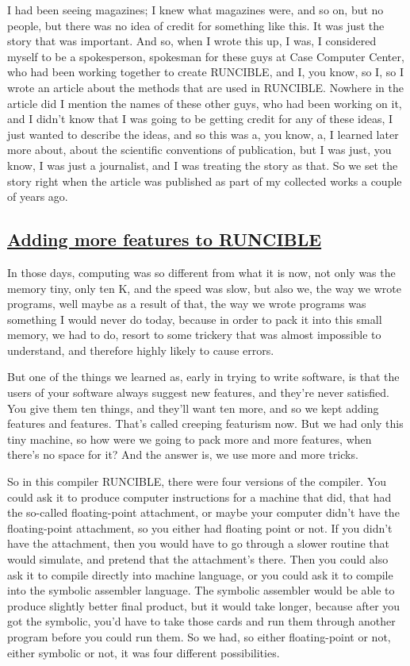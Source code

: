 \documentclass[]{article}
\begin{document}
I had been seeing magazines; I knew what magazines were, and so on, but
no people, but there was no idea of credit for something like this. It
was just the story that was important. And so, when I wrote this up, I
was, I considered myself to be a spokesperson, spokesman for these guys
at Case Computer Center, who had been working together to create
RUNCIBLE, and I, you know, so I, so I wrote an article about the methods
that are used in RUNCIBLE. Nowhere in the article did I mention the
names of these other guys, who had been working on it, and I didn't know
that I was going to be getting credit for any of these ideas, I just
wanted to describe the ideas, and so this was a, you know, a, I learned
later more about, about the scientific conventions of publication, but I
was just, you know, I was just a journalist, and I was treating the
story as that. So we set the story right when the article was published
as part of my collected works a couple of years ago.

\subsection{\texorpdfstring{\href{http://webofstories.com/play/17084}{Adding
more features to
RUNCIBLE}}{Adding more features to RUNCIBLE}}\label{adding-more-features-to-runcible}

In those days, computing was so different from what it is now, not only
was the memory tiny, only ten K, and the speed was slow, but also we,
the way we wrote programs, well maybe as a result of that, the way we
wrote programs was something I would never do today, because in order to
pack it into this small memory, we had to do, resort to some trickery
that was almost impossible to understand, and therefore highly likely to
cause errors.

But one of the things we learned as, early in trying to write software,
is that the users of your software always suggest new features, and
they're never satisfied. You give them ten things, and they'll want ten
more, and so we kept adding features and features. That's called
creeping featurism now. But we had only this tiny machine, so how were
we going to pack more and more features, when there's no space for it?
And the answer is, we use more and more tricks.

So in this compiler RUNCIBLE, there were four versions of the compiler.
You could ask it to produce computer instructions for a machine that
did, that had the so-called floating-point attachment, or maybe your
computer didn't have the floating-point attachment, so you either had
floating point or not. If you didn't have the attachment, then you would
have to go through a slower routine that would simulate, and pretend
that the attachment's there. Then you could also ask it to compile
directly into machine language, or you could ask it to compile into the
symbolic assembler language. The symbolic assembler would be able to
produce slightly better final product, but it would take longer, because
after you got the symbolic, you'd have to take those cards and run them
through another program before you could run them. So we had, so either
floating-point or not, either symbolic or not, it was four different
possibilities.
\end{document}
